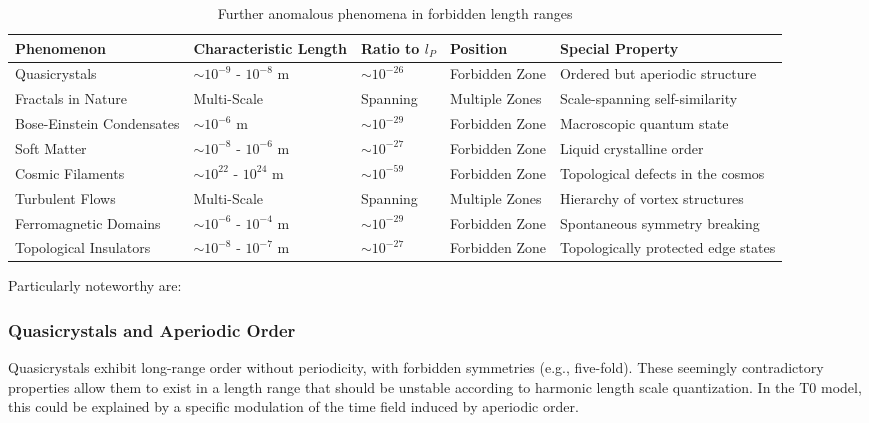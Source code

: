 \documentclass[12pt,a4paper]{article}
\begin{document}
	\begin{table}[h]
		\centering
		\begin{adjustbox}{scale=0.65}
			\begin{tabular}{lllll}
				\hline
				\textbf{Phenomenon} & \textbf{Characteristic Length} & \textbf{Ratio to $l_P$} & \textbf{Position} & \textbf{Special Property} \\
				\hline
				Quasicrystals & $\sim 10^{-9}$ - $10^{-8}$ m & $\sim 10^{-26}$ & Forbidden Zone & Ordered but aperiodic structure \\
				Fractals in Nature & Multi-Scale & Spanning & Multiple Zones & Scale-spanning self-similarity \\
				Bose-Einstein Condensates & $\sim 10^{-6}$ m & $\sim 10^{-29}$ & Forbidden Zone & Macroscopic quantum state \\
				Soft Matter & $\sim 10^{-8}$ - $10^{-6}$ m & $\sim 10^{-27}$ & Forbidden Zone & Liquid crystalline order \\
				Cosmic Filaments & $\sim 10^{22}$ - $10^{24}$ m & $\sim 10^{-59}$ & Forbidden Zone & Topological defects in the cosmos \\
				Turbulent Flows & Multi-Scale & Spanning & Multiple Zones & Hierarchy of vortex structures \\
				Ferromagnetic Domains & $\sim 10^{-6}$ - $10^{-4}$ m & $\sim 10^{-29}$ & Forbidden Zone & Spontaneous symmetry breaking \\
				Topological Insulators & $\sim 10^{-8}$ - $10^{-7}$ m & $\sim 10^{-27}$ & Forbidden Zone & Topologically protected edge states \\
				\hline
			\end{tabular}
		\end{adjustbox}
		\caption{Further anomalous phenomena in forbidden length ranges}
		\label{tab:more_anomalies}
	\end{table}
	
	Particularly noteworthy are:
	
	\subsubsection{Quasicrystals and Aperiodic Order}
	\label{subsubsec:quasikristalle}
	
	Quasicrystals exhibit long-range order without periodicity, with forbidden symmetries (e.g., five-fold). These seemingly contradictory properties allow them to exist in a length range that should be unstable according to harmonic length scale quantization. In the T0 model, this could be explained by a specific modulation of the time field induced by aperiodic order.
	
\end{document}
